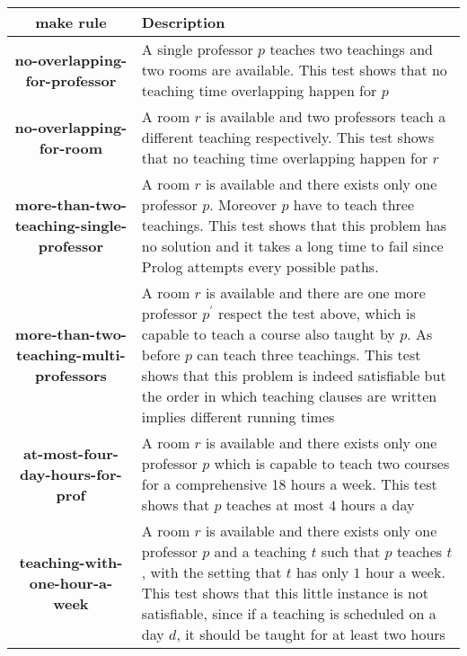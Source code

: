 \documentclass[10pt,a4paper]{article} %
\begin{document}
    \begin{table}
        \label{table:test-cases}
        \begin{tabular}{ c | p{6cm} }
            make rule & Description  \\
            \hline
            \textbf{no-overlapping-for-professor} & A single professor $p$
                teaches two teachings and two rooms are available.
                This test shows that no teaching time overlapping happen for $p$ \\
            \hline
            \textbf{no-overlapping-for-room} & A room $r$ is available and two
                professors teach a different teaching respectively.
                This test shows that no teaching time overlapping happen for $r$  \\
            \hline
            \textbf{more-than-two-teaching-single-professor} & A room $r$ is available and
                there exists only one professor $p$. Moreover $p$ have to teach three teachings.
                This test shows that this problem has no solution and it takes
                a long time to fail since Prolog attempts every possible paths. \\
            \hline
            \textbf{more-than-two-teaching-multi-professors} & A room $r$ is available and
                there are one more professor $p^\prime$ respect the test above,
                which is capable to teach a course also taught by $p$.
                As before $p$ can teach three teachings.
                This test shows that this problem is indeed satisfiable but
                the order in which teaching clauses are written implies different
                running times \\
            \hline
            \textbf{at-most-four-day-hours-for-prof} & A room $r$ is available and
                there exists only one professor $p$
                which is capable to teach two courses for a comprehensive 18 hours
                a week. This test shows that $p$ teaches at most $4$ hours a day\\
            \hline
            \textbf{teaching-with-one-hour-a-week} & A room $r$ is available and
                there exists only one professor $p$ and a teaching $t$ such that
                $p$ teaches $t$, with the setting that $t$ has only $1$ hour a week.
                This test shows that this little instance is not satisfiable,
                since if a teaching is scheduled on a day $d$, it should be taught
                for at least two hours \\

\end{tabular}
\end{table}
\end{document}
